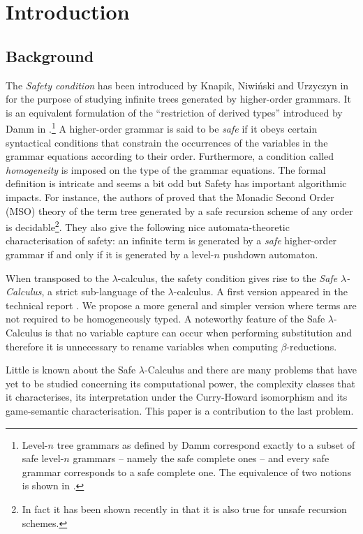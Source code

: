 \documentclass{llncs}
\begin{document}
\section{Introduction}

\subsection{Background}

The \emph{Safety condition} has been introduced by Knapik, Niwi{\'n}ski and Urzyczyn in \cite{KNU02} for the purpose of studying infinite trees generated by higher-order grammars.
It is an equivalent formulation of the ``restriction of derived types'' introduced by Damm in \cite{Dam82}.\footnote{Level-$n$ tree grammars as defined by Damm correspond exactly to a subset of safe level-$n$ grammars -- namely the safe complete ones -- and every safe grammar corresponds to a safe complete one. The equivalence of two notions is shown in \cite{demirandathesis}.}
A higher-order grammar is said to be \emph{safe} if it obeys certain syntactical conditions that constrain the occurrences of the variables in the grammar equations according to their order. Furthermore, a condition called \emph{homogeneity} is imposed on the type of the grammar equations.
The formal definition is intricate and seems a bit odd but Safety has important algorithmic impacts.
For instance, the authors of \cite{KNU02} proved that the Monadic Second Order (MSO) theory of the term tree generated by a safe recursion scheme of any order is decidable\footnote{In fact it has been shown recently in \cite{OngLics2006} that it is also true for unsafe recursion schemes.}. They also give the following nice automata-theoretic characterisation of safety:
an infinite term is generated by a \emph{safe} higher-order grammar if and only if it is generated by a level-$n$ pushdown automaton.


When transposed to the $\lambda$-calculus, the safety condition
gives rise to the \emph{Safe $\lambda$-Calculus}, a strict
sub-language of the $\lambda$-calculus. A first version appeared in the technical report \cite{safety-mirlong2004}. We propose a more general and simpler version where terms are not required to be homogeneously typed. A noteworthy feature of the Safe $\lambda$-Calculus is that no variable capture can occur when performing substitution and therefore it is unnecessary to rename variables when computing $\beta$-reductions.

Little is known about the Safe $\lambda$-Calculus and there are many problems that have yet to be studied concerning its computational power, the complexity classes that it characterises, its interpretation under the Curry-Howard isomorphism and its game-semantic characterisation. This paper is a contribution to the last problem.
\end{document}
